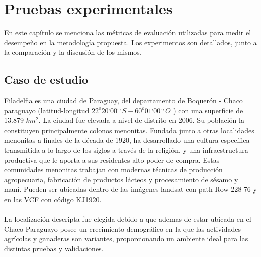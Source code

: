 \newpage{\ } 
\thispagestyle{empty} 

\chapter{Pruebas experimentales}
En este capítulo se menciona las m\'etricas de evaluaci\'on utilizadas para medir el desempe\~{n}o en la metodolog\'ia propuesta. Los experimentos son detallados, junto a la comparaci\'on y la discusi\'on de los mismos.

\section{Caso de estudio}
Filadelfia es una ciudad de Paraguay, del departamento de Boquer\'on - Chaco paraguayo (latitud-longitud $22^{o}20^{,}00^{,,} S - 60^{o}01^{,} 00^{,,} O$ ) con una superficie de 13.879 $ km^{2} $. La ciudad fue elevada a nivel de distrito en 2006. Su poblaci\'on la constituyen principalmente colonos menonitas. Fundada junto a otras localidades menonitas a finales de la d\'ecada de 1920, ha desarrollado una cultura espec\'ifica transmitida a lo largo de los siglos a trav\'es de la religi\'on, y una infraestructura productiva que le aporta a sus residentes alto poder de compra. Estas comunidades menonitas trabajan con modernas t\'ecnicas de producci\'on agropecuaria, fabricaci\'on de productos l\'acteos y procesamiento de s\'esamo y man\'i. Pueden ser ubicadas dentro de las im\'agenes landsat con path-Row 228-76 y en las VCF con c\'odigo KJ1920.\\~\\
La localizaci\'on descripta fue elegida debido a que ademas de estar ubicada en el Chaco Paraguayo posee un crecimiento demogr\'afico en la que las actividades agr\'icolas y ganaderas son variantes, proporcionando un ambiente ideal para las distintas pruebas y validaciones.

